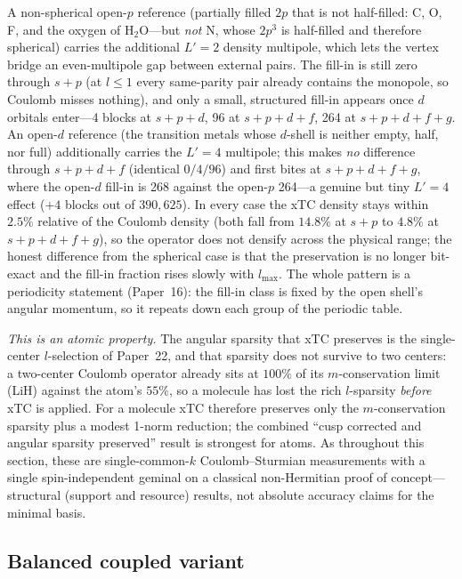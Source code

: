 \documentclass[aps,pra,twocolumn,superscriptaddress,longbibliography]{revtex4-2}
\begin{document}
A non-spherical open-$p$ reference (partially filled $2p$ that is not half-filled:
C, O, F, and the oxygen of H$_2$O---but \emph{not} N, whose $2p^3$ is half-filled and
therefore spherical) carries the additional $L'=2$ density multipole, which lets the
vertex bridge an even-multipole gap between external pairs.  The fill-in is still zero
through $s+p$ (at $l \le 1$ every same-parity pair already contains the monopole, so
Coulomb misses nothing), and only a small, structured fill-in appears once $d$
orbitals enter---4 blocks at $s+p+d$, 96 at $s+p+d+f$, 264 at $s+p+d+f+g$.  An
open-$d$ reference (the transition metals whose $d$-shell is neither empty, half, nor
full) additionally carries the $L'=4$ multipole; this makes \emph{no} difference
through $s+p+d+f$ (identical $0/4/96$) and first bites at $s+p+d+f+g$, where the
open-$d$ fill-in is 268 against the open-$p$ 264---a genuine but tiny $L'=4$ effect
($+4$ blocks out of $390{,}625$).  In every case the xTC density stays within $2.5\%$
relative of the Coulomb density (both fall from $14.8\%$ at $s+p$ to $4.8\%$ at
$s+p+d+f+g$), so the operator does not densify across the physical range; the honest
difference from the spherical case is that the preservation is no longer bit-exact and
the fill-in fraction rises slowly with $l_{\max}$.  The whole pattern is a periodicity
statement (Paper~16): the fill-in class is fixed by the open shell's angular momentum,
so it repeats down each group of the periodic table.

\emph{This is an atomic property.}  The angular sparsity that xTC preserves is the
single-center $l$-selection of Paper~22, and that sparsity does not survive to two
centers: a two-center Coulomb operator already sits at $100\%$ of its
$m$-conservation limit (LiH) against the atom's $55\%$, so a molecule has lost the
rich $l$-sparsity \emph{before} xTC is applied.  For a molecule xTC therefore
preserves only the $m$-conservation sparsity plus a modest 1-norm reduction; the
combined ``cusp corrected and angular sparsity preserved'' result is strongest for
atoms.  As throughout this section, these are single-common-$k$ Coulomb--Sturmian
measurements with a single spin-independent geminal on a classical non-Hermitian
proof of concept---structural (support and resource) results, not absolute accuracy
claims for the minimal basis.

\subsection{Balanced coupled variant}
\label{sec:balanced_coupled}
\end{document}
